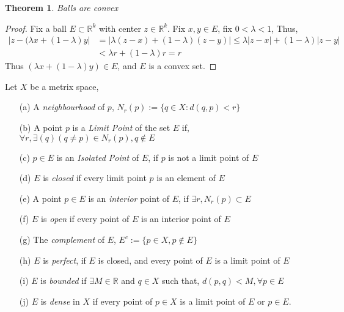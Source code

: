 \documentclass{amsart}
\numberwithin{equation}{section}
\theoremstyle{plain}
\newtheorem{thm}{Theorem}[section]
\theoremstyle{definition}
\begin{document}
\begin{thm}
  Balls are convex
\end{thm}

\begin{proof}
  Fix a ball $E \subset \mathbb{R}^k$ with center $z \in \mathbb{R}^k$. Fix $x, y \in E$, fix $0 < \lambda < 1$, Thus,
  \begin{align}
    |z - (\lambda x + (1 - \lambda)y| &= |\lambda (z - x) + (1 - \lambda)(z - y)| \leq \lambda| z - x| + (1 - \lambda)|z - y| \\
    &< \lambda r + (1-\lambda)r = r
  \end{align}
  Thus $(\lambda x + (1-\lambda)y) \in E$, and $E$ is a convex set. 
\end{proof}
Let $X$ be a metrix space, 
\begin{enumerate}
  \item[(a)] A \textit{neighbourhood} of $p$, $N_r(p) := \{q \in X: d(q, p) < r\}$\\
  \item[(b)] A point $p$ is a \textit{Limit Point} of the set $E$ if, $\forall r, \exists (q)(q \not= p) \in N_r(p), q \not \in E$\\
  \item[(c)] $p \in E$ is an \textit{Isolated Point} of $E$, if $p$ is not a limit point of $E$ \\
  \item[(d)] $E$ is \textit{closed} if every limit point $p$ is an element of $E$ \\
  \item[(e)] A point $p \in E$ is an \textit{interior} point of $E$, if $\exists r, N_r(p) \subset E$ \\
  \item[(f)] $E$ is \textit{open} if every point of $E$ is an interior point of $E$ \\ 
  \item[(g)] The \textit{complement} of $E$,  $E^c := \{p \in X, p \not \in E \}$ \\
  \item[(h)] $E$ is \textit{perfect}, if $E$ is closed, and every point of $E$ is a limit point of $E$ \\
  \item[(i)] $E$ is \textit{bounded} if $\exists M \in \mathbb{R}$ and $q \in X$ such that, $d(p,q) < M, \forall p \in E$ \\
  \item[(j)] $E$ is \textit{dense} in $X$ if every point of $p \in X$ is a limit point of $E$ or $p \in E$.\\
\end{enumerate}
\end{document}
